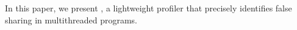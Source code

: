 \label{sec:conclusion}

In this paper, we present \cheetah{}, a lightweight profiler that precisely identifies false sharing in multithreaded programs. \cheetah{} 